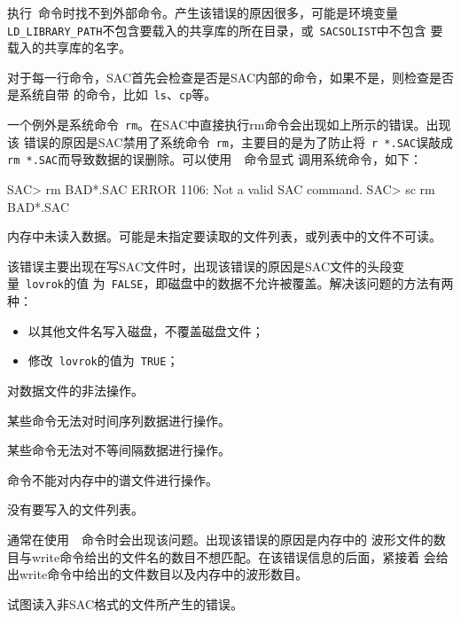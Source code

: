执行~命令时找不到外部命令。产生该错误的原因很多，可能是环境变量
\verb+LD_LIBRARY_PATH+不包含要载入的共享库的所在目录，或~\verb+SACSOLIST+中不包含
要载入的共享库的名字。

对于每一行命令，SAC首先会检查是否是SAC内部的命令，如果不是，则检查是否是系统自带
的命令，比如~\verb+ls+、\verb+cp+等。

一个例外是系统命令~\verb+rm+。在SAC中直接执行rm命令会出现如上所示的错误。出现该
错误的原因是SAC禁用了系统命令~\verb+rm+，主要目的是为了防止将~\verb+r *.SAC+误敲成
\verb+rm *.SAC+而导致数据的误删除。可以使用~~命令显式
调用系统命令，如下：
\begin{SACCode}
SAC> rm BAD*.SAC
 ERROR 1106: Not a valid SAC command.
SAC> sc rm BAD*.SAC
\end{SACCode}

内存中未读入数据。可能是未指定要读取的文件列表，或列表中的文件不可读。

该错误主要出现在写SAC文件时，出现该错误的原因是SAC文件的头段变量~\verb+lovrok+的值
为~\verb+FALSE+，即磁盘中的数据不允许被覆盖。解决该问题的方法有两种：
\begin{itemize}
\item 以其他文件名写入磁盘，不覆盖磁盘文件；
\item 修改~\verb+lovrok+的值为~\verb+TRUE+；
\end{itemize}

对数据文件的非法操作。

某些命令无法对时间序列数据进行操作。

某些命令无法对不等间隔数据进行操作。

命令不能对内存中的谱文件进行操作。

没有要写入的文件列表。

通常在使用~~命令时会出现该问题。出现该错误的原因是内存中的
波形文件的数目与write命令给出的文件名的数目不想匹配。在该错误信息的后面，紧接着
会给出write命令中给出的文件数目以及内存中的波形数目。

试图读入非SAC格式的文件所产生的错误。

